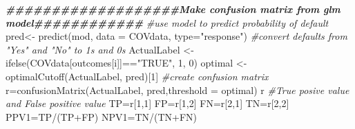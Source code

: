 \documentclass[
]{article}
\newenvironment{Shaded}{\begin{snugshade}}{\end{snugshade}}
\newcommand{\AttributeTok}[1]{\textcolor[rgb]{0.77,0.63,0.00}{#1}}
\newcommand{\CommentTok}[1]{\textcolor[rgb]{0.56,0.35,0.01}{\textit{#1}}}
\newcommand{\DecValTok}[1]{\textcolor[rgb]{0.00,0.00,0.81}{#1}}
\newcommand{\DocumentationTok}[1]{\textcolor[rgb]{0.56,0.35,0.01}{\textbf{\textit{#1}}}}
\newcommand{\FunctionTok}[1]{\textcolor[rgb]{0.00,0.00,0.00}{#1}}
\newcommand{\NormalTok}[1]{#1}
\newcommand{\OtherTok}[1]{\textcolor[rgb]{0.56,0.35,0.01}{#1}}
\newcommand{\SpecialCharTok}[1]{\textcolor[rgb]{0.00,0.00,0.00}{#1}}
\newcommand{\StringTok}[1]{\textcolor[rgb]{0.31,0.60,0.02}{#1}}
\begin{document}
\begin{Shaded}
\begin{Highlighting}[]
  
    \DocumentationTok{\#\#\#\#\#\#\#\#\#\#\#\#\#\#\#\#\#\#\#Make confusion matrix from glm model\#\#\#\#\#\#\#\#\#\#\#\#}
    \CommentTok{\#use model to predict probability of default}
\NormalTok{    pred}\OtherTok{\textless{}{-}} \FunctionTok{predict}\NormalTok{(mod, }\AttributeTok{data =}\NormalTok{ COVdata, }\AttributeTok{type=}\StringTok{"response"}\NormalTok{)}
    \CommentTok{\#convert defaults from "Yes" and "No" to 1\textquotesingle{}s and 0\textquotesingle{}s}
\NormalTok{    ActualLabel }\OtherTok{\textless{}{-}} \FunctionTok{ifelse}\NormalTok{(COVdata[outcomes[i]]}\SpecialCharTok{==}\StringTok{"TRUE"}\NormalTok{, }\DecValTok{1}\NormalTok{, }\DecValTok{0}\NormalTok{)}
\NormalTok{    optimal }\OtherTok{\textless{}{-}} \FunctionTok{optimalCutoff}\NormalTok{(ActualLabel, pred)[}\DecValTok{1}\NormalTok{]}
    \CommentTok{\#create confusion matrix}
\NormalTok{    r}\OtherTok{=}\FunctionTok{confusionMatrix}\NormalTok{(ActualLabel, pred,}\AttributeTok{threshold =}\NormalTok{ optimal)}
\NormalTok{    r}
    \CommentTok{\#True posive value and False positive value}
\NormalTok{    TP}\OtherTok{=}\NormalTok{r[}\DecValTok{1}\NormalTok{,}\DecValTok{1}\NormalTok{]}
\NormalTok{    FP}\OtherTok{=}\NormalTok{r[}\DecValTok{1}\NormalTok{,}\DecValTok{2}\NormalTok{]}
\NormalTok{    FN}\OtherTok{=}\NormalTok{r[}\DecValTok{2}\NormalTok{,}\DecValTok{1}\NormalTok{]}
\NormalTok{    TN}\OtherTok{=}\NormalTok{r[}\DecValTok{2}\NormalTok{,}\DecValTok{2}\NormalTok{]}
\NormalTok{    PPV1}\OtherTok{=}\NormalTok{TP}\SpecialCharTok{/}\NormalTok{(TP}\SpecialCharTok{+}\NormalTok{FP)}
\NormalTok{    NPV1}\OtherTok{=}\NormalTok{TN}\SpecialCharTok{/}\NormalTok{(TN}\SpecialCharTok{+}\NormalTok{FN)}
  

\end{Highlighting}
\end{Shaded}
\end{document}
